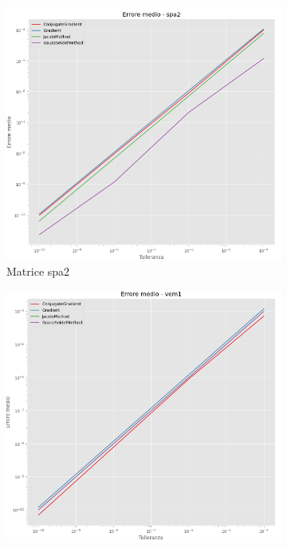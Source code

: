 \begin{figure}[!ht]
\begin{subfigure}{0.45\textwidth}
        \includegraphics[width=\textwidth]{./../report/Progetto_1_bis/img/error_spa2.png}
        \caption{Matrice spa2}
        \label{fig:error_spa2}
    \end{subfigure}
    \begin{subfigure}{0.45\textwidth}
        \centering
        \includegraphics[width=\textwidth]{./../report/Progetto_1_bis/img/error_vem1.png}

\end{subfigure}
\end{figure}
